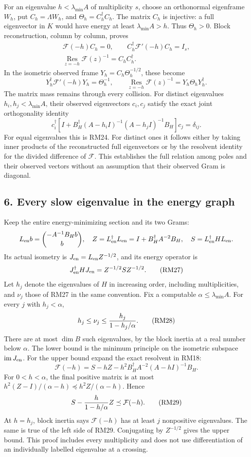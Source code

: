 \documentclass[11pt]{article}
\begin{document}
For an eigenvalue \(h<\lambda_{\min}A\) of multiplicity \(s\), choose an orthonormal eigenframe \(W_h\), put \(C_h=\Lambda W_h\), and \(\Theta_h=C_h^\dagger C_h\). The matrix \(C_h\) is injective: a full eigenvector in \(K\) would have energy at least \(\lambda_{\min}A>h\). Thus \(\Theta_h>0\). Block reconstruction, column by column, proves \[
\begin{gathered}
\mathcal F(-h)C_h=0,\qquad
C_h^\dagger\mathcal F'(-h)C_h=I_s,\\
\operatorname*{Res}_{z=-h}\mathcal F(z)^{-1}=C_hC_h^\dagger.
\end{gathered}\tag{RM24}
\] In the isometric observed frame \(Y_h=C_h\Theta_h^{-1/2}\), these become \[
Y_h^\dagger\mathcal F'(-h)Y_h=\Theta_h^{-1},
\qquad\operatorname*{Res}_{z=-h}\mathcal F(z)^{-1}
=Y_h\Theta_hY_h^\dagger.
\tag{RM25}
\] The matrix mass remains through every collision. For distinct eigenvalues \(h_i,h_j<\lambda_{\min}A\), their observed eigenvectors \(c_i,c_j\) satisfy the exact joint orthogonality identity \[
c_i^\dagger\left[I+B_H^\dagger(A-h_iI)^{-1}(A-h_jI)^{-1}B_H\right]c_j
=\delta_{ij}.
\tag{RM26}
\] For equal eigenvalues this is RM24. For distinct ones it follows either by taking inner products of the reconstructed full eigenvectors or by the resolvent identity for the divided difference of \(\mathcal F\). This establishes the full relation among poles and their observed vectors without an assumption that their observed Gram is diagonal.

\subsection{6. Every slow eigenvalue in the energy graph}\label{every-slow-eigenvalue-in-the-energy-graph}

Keep the entire energy-minimizing section and its two Grams: \[
L_{\rm en}b=\binom{-A^{-1}B_Hb}{b},\quad
Z=L_{\rm en}^\dagger L_{\rm en}=I+B_H^\dagger A^{-2}B_H,
\quad S=L_{\rm en}^\dagger HL_{\rm en}.
\] Its actual isometry is \(J_{\rm en}=L_{\rm en}Z^{-1/2}\), and its energy operator is \[
J_{\rm en}^\dagger HJ_{\rm en}=Z^{-1/2}SZ^{-1/2}.
\tag{RM27}
\] Let \(h_j\) denote the eigenvalues of \(H\) in increasing order, including multiplicities, and \(\nu_j\) those of RM27 in the same convention. Fix a computable \(\alpha\le\lambda_{\min}A\). For every \(j\) with \(h_j<\alpha\), \[
h_j\le\nu_j\le {h_j\over1-h_j/\alpha}.
\tag{RM28}
\] There are at most \(\dim B\) such eigenvalues, by the block inertia at a real number below \(\alpha\). The lower bound is the minimum principle on the isometric subspace \(\operatorname{im}J_{\rm en}\). For the upper bound expand the exact resolvent in RM18: \[
\mathcal F(-h)=S-hZ-h^2B_H^\dagger A^{-2}(A-hI)^{-1}B_H.
\] For \(0<h<\alpha\), the final positive matrix is at most \(h^2(Z-I)/(\alpha-h)\preceq h^2Z/(\alpha-h)\). Hence \[
S-{h\over1-h/\alpha}Z\preceq\mathcal F(-h).
\tag{RM29}
\] At \(h=h_j\), block inertia says \(\mathcal F(-h)\) has at least \(j\) nonpositive eigenvalues. The same is true of the left side of RM29. Conjugating by \(Z^{-1/2}\) gives the upper bound. This proof includes every multiplicity and does not use differentiation of an individually labelled eigenvalue at a crossing.
\end{document}
